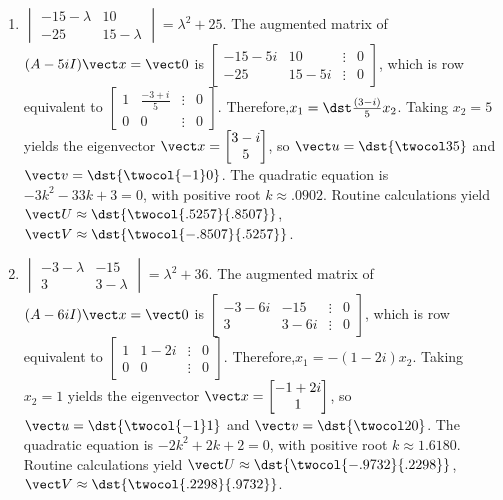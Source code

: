 \documentclass[openany]{book}
\newenvironment{sectionSolutions}{
 \begin{enumerate}[item-label={\thesection.\arabic{enumi}.}]
}{
 \end{enumerate}
}
\begin{document}
\begin{sectionSolutions}
\item
$\begin{vmatrix}-15-\lambda&10\\-25&15-\lambda
\end{vmatrix}=\lambda^2+25$.
The augmented matrix of $(A-5iI){\vect x}={\vect 0}$ is
$\begin{bmatrix}-15-5i&10&\vdots&0\\
-25&15-5i&\vdots&0 \end{bmatrix}$,
which is row equivalent to
$\begin{bmatrix} 1&\frac{-3+i}{5}&\vdots&0\\ 0&0&\vdots&0
\end{bmatrix}$.
Therefore,$x_1=\dst\frac{(3-i)}{5}x_2$. Taking $x_2=5$
yields the eigenvector
 ${\vect x}=\begin{bmatrix}3-i\\5\end{bmatrix}$,
so ${\vect u}=\dst{\twocol35}$ and ${\vect v}=\dst{\twocol{-1}0}$.
The quadratic equation is $-3k^2-33k+3=0$, with positive root
$k\approx.0902$.
 Routine calculations yield
 ${\vect U}\approx\dst{\twocol{.5257}{.8507}}$,
${\vect V}\approx\dst{\twocol{-.8507}{.5257}}$.


\item
$\begin{vmatrix}-3-\lambda&-15\\3&3-\lambda
\end{vmatrix}=\lambda^2+36$.
The augmented matrix of $(A-6iI){\vect x}={\vect 0}$ is
$\begin{bmatrix}-3-6i&-15&\vdots&0\\
3&3-6i&\vdots&0 \end{bmatrix}$,
which is row equivalent to
$\begin{bmatrix} 1&1-2i&\vdots&0\\ 0&0&\vdots&0
\end{bmatrix}$.
Therefore,$x_1=-(1-2i)x_2$. Taking $x_2=1$
yields the eigenvector
 ${\vect x}=\begin{bmatrix}-1+2i\\1\end{bmatrix}$,
so ${\vect u}=\dst{\twocol{-1}1}$ and ${\vect v}=\dst{\twocol20}$.
The quadratic equation is $-2k^2+2k+2=0$, with positive root
$k\approx1.6180$.
 Routine calculations yield
 ${\vect U}\approx\dst{\twocol{-.9732}{.2298}}$,
${\vect V}\approx\dst{\twocol{.2298}{.9732}}$.




\end{sectionSolutions}
\end{document}
